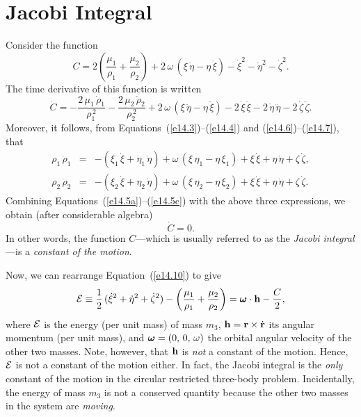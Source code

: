 \section{Jacobi Integral}\label{sjac}
Consider the function
\begin{equation}\label{e14.10}
C = 2\left(\frac{\mu_1}{\rho_1}+\frac{\mu_2}{\rho_2}\right)  + 2\,\omega\,(\xi\,\dot{\eta}-\eta\,\dot{\xi})
-\dot{\xi}^2-\dot{\eta}^2-\dot{\zeta}^2.
\end{equation}
The time derivative of this function is
written
\begin{equation}
\dot{C} = - \frac{2\,\mu_1\,\dot{\rho}_1}{\rho_1^{\,2}}  - \frac{2\,\mu_2\,\dot{\rho}_2}{\rho_2^{\,2}} 
+ 2\,\omega\,(\xi\,\ddot{\eta} - \eta\,\ddot{\xi}) - 2\,\dot{\xi}\,\ddot{\xi} - 2\,\dot{\eta}\,\ddot{\eta}
- 2\,\dot{\zeta}\,\ddot{\zeta}.
\end{equation}
Moreover, it follows, from Equations~(\ref{e14.3})--(\ref{e14.4}) and  (\ref{e14.6})--(\ref{e14.7}),
that
\begin{eqnarray}
\rho_1\,\dot{\rho}_1 &=& -(\xi_1\,\dot{\xi}+\eta_1\,\dot{\eta}) + \omega\,(\xi\,\eta_1-\eta\,\xi_1) + \xi\,\dot{\xi}
 + \eta\,\dot{\eta} + \zeta\,\dot{\zeta},\\[0.5ex]
\rho_2\,\dot{\rho}_2 &=& -(\xi_2\,\dot{\xi}+\eta_2\,\dot{\eta}) + \omega\,(\xi\,\eta_2-\eta\,\xi_2) + \xi\,\dot{\xi}
 + \eta\,\dot{\eta} + \zeta\,\dot{\zeta}.
\end{eqnarray}
Combining Equations~(\ref{e14.5a})--(\ref{e14.5c}) with the above three expressions, we obtain (after considerable
algebra)
\begin{equation}
\dot{C} = 0.
\end{equation}
In other words, the function $C$---which is usually referred to as the {\em Jacobi integral}---is a {\em
constant of the motion}.

Now, we can rearrange Equation~(\ref{e14.10}) to give
\begin{equation}\label{e14.15}
{\cal E} \equiv \frac{1}{2}\,(\dot{\xi}^2+\dot{\eta}^2+\dot{\zeta}^2) -\left(\frac{\mu_1}{\rho_1}+\frac{\mu_2}{\rho_2}\right)
= \bomega\cdot{\bf h} - \frac{C}{2},
\end{equation}
where ${\cal E}$ is the energy (per unit mass) of mass $m_3$, ${\bf h} = {\bf r}\times \dot{\bf r}$ its angular momentum
(per unit mass), and $\mbox{\boldmath$\omega$}=(0,\,0,\,\omega)$  the orbital angular velocity of the other two masses.
Note, however, that ${\bf h}$ is {\em not}\/ a constant of the motion. Hence, ${\cal E}$ is not 
a constant of the motion either. In fact, the Jacobi integral is the {\em only}\/ constant of the
motion in the circular restricted three-body problem. Incidentally, the energy 
of mass $m_3$ is not a conserved quantity because the other two masses in the system
are {\em moving}. 

